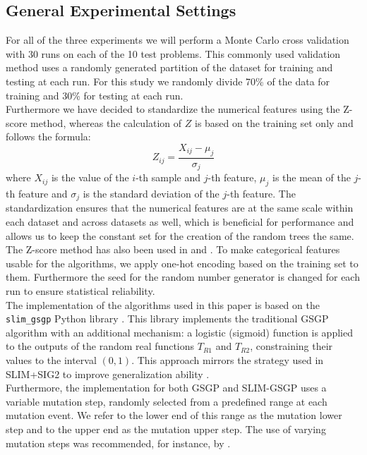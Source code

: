\documentclass[manuscript, review, anonymous]{acmart} %
\begin{document}
\subsection{General Experimental Settings}
\label{sec:settings}
For all of the three experiments
we will perform a Monte Carlo cross validation with 30
runs on each of the 10 test problems.
This commonly used \cite{Vanneschi2024, Bakurov2022} validation method uses a randomly generated partition
of the dataset for training and testing at each run.
For this study we randomly divide 70\% of the data for training and 30\% for testing at each run.\\
Furthermore we have decided to standardize the numerical features using the Z-score method, whereas the calculation of $Z$
is based on the training set only and follows the formula:
\[
Z_{ij} = \frac{X_{ij} - \mu_j}{\sigma_j}
\]
where $X_{ij}$ is the value of the $i$-th sample and
$j$-th feature,
$\mu_j$ is the mean of the $j$-th feature and $\sigma_j$ is the standard deviation of the $j$-th feature.
The standardization ensures that the numerical features are at the same scale within each dataset and across datasets as well,
which is beneficial for performance and allows us to keep the constant set for the creation of the random trees the same. 
The Z-score method has 
also been used in \cite{Bakurov2019} and \cite{Frank2023}.
To make categorical features usable for the algorithms, we apply one-hot encoding based on the training set to them.
Furthermore the 
seed for the random number generator is changed for each run to ensure statistical reliability.\\
The implementation of the algorithms used in this paper is based on the \texttt{slim\_gsgp} Python library \cite{Vanneschi2025}. 
This library implements the traditional GSGP algorithm with an additional mechanism: 
a logistic (sigmoid) function is applied to the outputs of the random real 
functions \( T_{R1} \) and \( T_{R2} \), 
constraining their values to the interval \((0, 1)\). 
This approach mirrors the strategy used in SLIM+SIG2 to improve
generalization ability \cite{Vanneschi2024, general}.\\
Furthermore, the implementation for both GSGP and SLIM-GSGP uses a variable mutation step, 
randomly selected from a predefined range at each mutation event. 
We refer to the lower end of this range as the mutation lower step 
and to the upper end as the mutation upper step. 
The use of varying mutation steps was recommended, for instance, by \cite{Vanneschi2014}.\\
\end{document}
